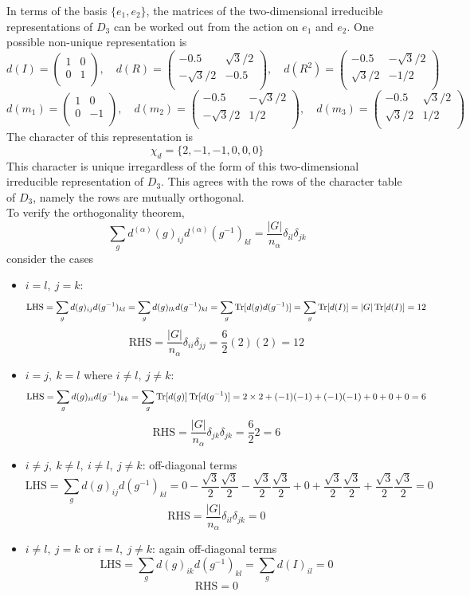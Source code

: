 \documentclass[a4paper]{article}
\begin{document}
\begin{ans}
In terms of the basis $\{e_1,e_2\}$, the matrices of the two-dimensional irreducible representations of $D_3$ can be worked out from the action on $e_1$ and $e_2$. One possible non-unique representation is
$$d(I)=\begin{pmatrix}1&0\\0&1\\\end{pmatrix},\quad d(R)=\begin{pmatrix}-0.5&\sqrt{3}/2\\-\sqrt{3}/2&-0.5\\\end{pmatrix},\quad d(R^2)=\begin{pmatrix}-0.5& -\sqrt{3}/2\\\sqrt{3}/2&-1/2\\\end{pmatrix}$$
$$d(m_1)=\begin{pmatrix}1&0\\0&-1\\\end{pmatrix},\quad d(m_2)=\begin{pmatrix}-0.5&-\sqrt{3}/2\\-\sqrt{3}/2&1/2\\\end{pmatrix},\quad d(m_3)=\begin{pmatrix}-0.5&\sqrt{3}/2\\\sqrt{3}/2&1/2\\\end{pmatrix}$$
The character of this representation is
$$\chi_d=\{2,-1,-1,0,0,0\}$$
This character is unique irregardless of the form of this two-dimensional irreducible representation of $D_3$. This agrees with the rows of the character table of $D_3$, namely the rows are mutually orthogonal.\\[5pt]
To verify the orthogonality theorem,
$$\sum_gd^{(\alpha)}(g)_{ij}d^{(\alpha)}(g^{-1})_{kl}=\frac{|G|}{n_\alpha}\delta_{il}\delta_{jk}$$
consider the cases
\begin{itemize}
\item $i=l,~j=k$:
$$\text{LHS}=\sum_gd(g)_{ij}d(g^{-1})_{kl}=\sum_gd(g)_{lk}d(g^{-1})_{kl}=\sum_g\operatorname{Tr}[d(g)d(g^{-1})]=\sum_g\operatorname{Tr}[d(I)]=|G|\operatorname{Tr}[d(I)]=12$$
$$\text{RHS}=\frac{|G|}{n_\alpha}\delta_{ii}\delta_{jj}=\frac{6}{2}(2)(2)=12$$
    \item $i=j,~k=l$ where $i\neq l,~j\neq k$: 
    $$\text{LHS}=\sum_gd(g)_{ii}d(g^{-1})_{kk}=\sum_g\operatorname{Tr}[d(g)]\operatorname{Tr}[d(g^{-1})]=2\times 2+(-1)(-1)+(-1)(-1)+0+0+0=6$$
    $$\text{RHS}=\frac{|G|}{n_\alpha}\delta_{jk}\delta_{jk}=\frac{6}{2}2=6$$
    \item $i\neq j,~k\neq l,~i\neq l,~j\neq k$: off-diagonal terms
    $$\text{LHS}=\sum_gd(g)_{ij}d(g^{-1})_{kl}=0-\frac{\sqrt{3}}{2}\frac{\sqrt{3}}{2}-\frac{\sqrt{3}}{2}\frac{\sqrt{3}}{2}+0+\frac{\sqrt{3}}{2}\frac{\sqrt{3}}{2}+\frac{\sqrt{3}}{2}\frac{\sqrt{3}}{2}=0$$
    $$\text{RHS}=\frac{|G|}{n_\alpha}\delta_{il}\delta_{jk}=0$$
    \item $i\neq l,~j=k$ or $i=l,~j\neq k$: again off-diagonal terms
    $$\text{LHS}=\sum_gd(g)_{ik}d(g^{-1})_{kl}=\sum_gd(I)_{il}=0$$
    $$\text{RHS}=0$$
\end{itemize}
\end{ans}
\end{document}
